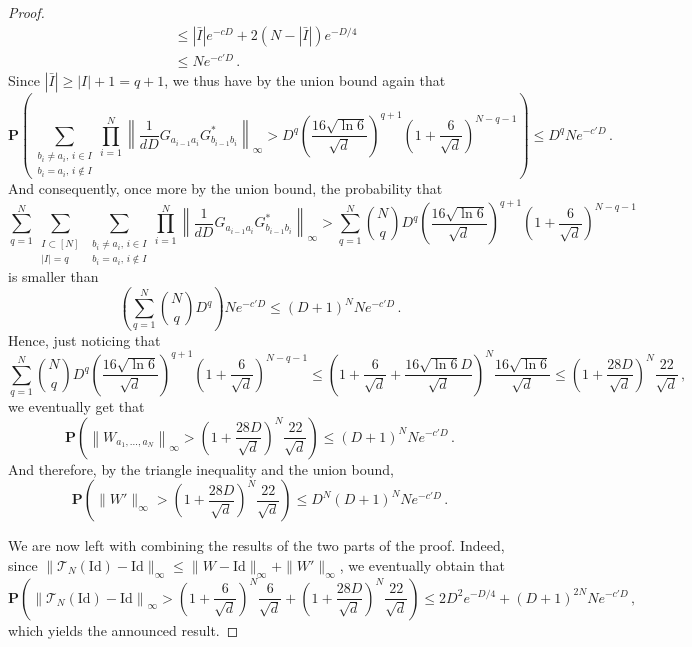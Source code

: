 \documentclass{amsart}
\renewcommand{\P}{\mathbf{P}}
\renewcommand{\leq}{\leqslant}
\renewcommand{\geq}{\geqslant}
\newcommand{\Id}{\mathrm{Id}}
\begin{document}
\begin{proof}
\begin{align*}
                                                                                                                                                                                                                    & \leq |\bar{I}|e^{-cD} + 2(N-|\bar{I}|)e^{-D/4}                                                                                               \\
                                                                                                                                                                                                                    & \leq Ne^{-c'D} \, .
    \end{align*}
    Since $|\bar{I}|\geq|I|+1=q+1$, we thus have by the union bound again that
    \[ \P\left( \sum_{\substack{b_i\neq a_i,\,i\in I \\ b_i=a_i,\,i\notin I}} \prod_{i=1}^N \left\|\frac{1}{dD}G_{a_{i-1}a_i}G^*_{b_{i-1}b_i} \right\|_\infty > D^q\left(\frac{16\sqrt{\ln 6}}{\sqrt{d}}\right)^{q+1} \left(1+\frac{6}{\sqrt{d}}\right)^{N-q-1} \right) \leq D^qNe^{-c'D} \, . \]
    And consequently, once more by the union bound, the probability that
    \[ \sum_{q=1}^N \sum_{\substack{I\subset[N] \\ |I|=q}} \sum_{\substack{b_i\neq a_i,\,i\in I \\ b_i=a_i,\,i\notin I}} \prod_{i=1}^N \left\|\frac{1}{dD}G_{a_{i-1}a_i}G^*_{b_{i-1}b_i} \right\|_\infty > \sum_{q=1}^N {N\choose q}D^q\left(\frac{16\sqrt{\ln 6}}{\sqrt{d}}\right)^{q+1} \left(1+\frac{6}{\sqrt{d}}\right)^{N-q-1}  \]
    is smaller than
    \[  \left(\sum_{q=1}^N {N\choose q}D^q\right) Ne^{-c'D} \leq (D+1)^N Ne^{-c'D} \, . \]
    Hence, just noticing that
    \[ \sum_{q=1}^N {N\choose q}D^q\left(\frac{16\sqrt{\ln 6}}{\sqrt{d}}\right)^{q+1} \left(1+\frac{6}{\sqrt{d}}\right)^{N-q-1} \leq \left(1+\frac{6}{\sqrt{d}}+\frac{16\sqrt{\ln 6}D}{\sqrt{d}}\right)^N\frac{16\sqrt{\ln 6}}{\sqrt{d}} \leq \left(1+\frac{28D}{\sqrt{d}}\right)^N\frac{22}{\sqrt{d}} \, , \]
    we eventually get that
    \[ \P\left( \left\|W_{a_1,\ldots,a_N}\right\|_\infty > \left(1+\frac{28D}{\sqrt{d}}\right)^N\frac{22}{\sqrt{d}} \right) \leq (D+1)^N Ne^{-c'D} \, . \]
    And therefore, by the triangle inequality and the union bound,
    \[ \P\left(\|W'\|_\infty > \left(1+\frac{28D}{\sqrt{d}}\right)^N\frac{22}{\sqrt{d}} \right) \leq D^N(D+1)^N Ne^{-c'D} \, . \]

    We are now left with combining the results of the two parts of the proof. Indeed, since $\|\mathcal T_N(\Id)-\Id\|_\infty \leq \|W-\Id\|_\infty+\|W'\|_\infty$, we eventually obtain that
    \[ \P\left( \left\|\mathcal T_N(\Id)-\Id\right\|_\infty > \left(1+\frac{6}{\sqrt{d}}\right)^N\frac{6}{\sqrt{d}} + \left(1+\frac{28D}{\sqrt{d}}\right)^N\frac{22}{\sqrt{d}} \right) \leq 2D^2e^{-D/4} + (D+1)^{2N} Ne^{-c'D} \, ,  \]
    which yields the announced result.
\end{proof}
\end{document}
